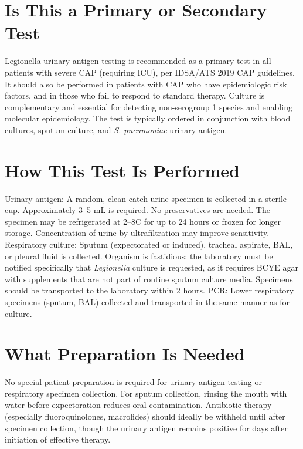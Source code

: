 \section*{Is This a Primary or Secondary Test}
Legionella urinary antigen testing is recommended as a primary test in all patients with severe CAP (requiring ICU), per IDSA/ATS 2019 CAP guidelines. It should also be performed in patients with CAP who have epidemiologic risk factors, and in those who fail to respond to standard therapy. Culture is complementary and essential for detecting non-serogroup 1 species and enabling molecular epidemiology. The test is typically ordered in conjunction with blood cultures, sputum culture, and \textit{S. pneumoniae} urinary antigen.

\section*{How This Test Is Performed}
Urinary antigen: A random, clean-catch urine specimen is collected in a sterile cup. Approximately 3--5 mL is required. No preservatives are needed. The specimen may be refrigerated at 2--8\textdegree{}C for up to 24 hours or frozen for longer storage. Concentration of urine by ultrafiltration may improve sensitivity. Respiratory culture: Sputum (expectorated or induced), tracheal aspirate, BAL, or pleural fluid is collected. Organism is fastidious; the laboratory must be notified specifically that \textit{Legionella} culture is requested, as it requires BCYE agar with supplements that are not part of routine sputum culture media. Specimens should be transported to the laboratory within 2 hours. PCR: Lower respiratory specimens (sputum, BAL) collected and transported in the same manner as for culture.

\section*{What Preparation Is Needed}
No special patient preparation is required for urinary antigen testing or respiratory specimen collection. For sputum collection, rinsing the mouth with water before expectoration reduces oral contamination. Antibiotic therapy (especially fluoroquinolones, macrolides) should ideally be withheld until after specimen collection, though the urinary antigen remains positive for days after initiation of effective therapy.

